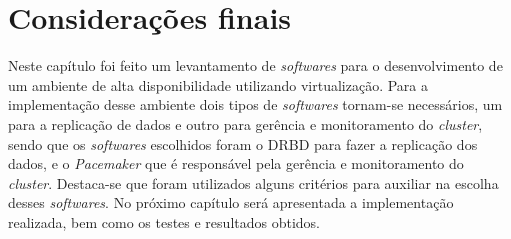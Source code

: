 

\section{Considerações finais}

Neste capítulo foi feito um levantamento de \textit{softwares} para o desenvolvimento de um ambiente de alta disponibilidade utilizando 
virtualização. Para a implementação desse ambiente dois tipos de \textit{softwares} tornam-se necessários, um para a replicação de dados e outro 
para gerência e monitoramento do \textit{cluster}, sendo que os \textit{softwares} escolhidos foram o \ac{DRBD} para fazer a replicação dos dados, 
e o \textit{Pacemaker} que é responsável pela gerência e monitoramento do \textit{cluster}. Destaca-se que foram utilizados alguns critérios 
para auxiliar na escolha desses \textit{softwares}.
No próximo capítulo será apresentada a implementação realizada, bem como os testes e resultados obtidos.
